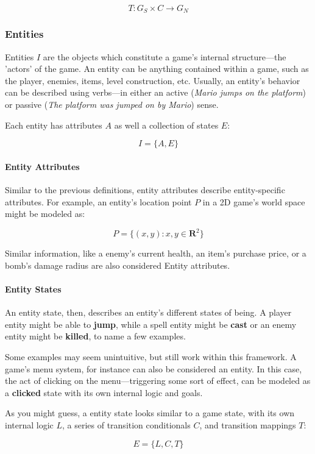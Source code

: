 \documentclass{report}
\begin{document}
$$
T: G_S \times C \longrightarrow G_N
$$

\subsubsection{Entities}
Entities $I$ are the objects which constitute a game's internal structure---the 'actors' of the game. An entity can be anything contained within a game, such as the player, enemies, items, level construction, etc.  Usually, an entity's behavior can be described using verbs---in either an active (\emph{Mario jumps on the platform}) or passive (\emph{The platform was jumped on by Mario}) sense.

Each entity has attributes $A$ as well a collection of states $E$:

$$I = \{A, E\}$$

\paragraph{Entity Attributes}
Similar to the previous definitions, entity attributes describe entity-specific attributes. For example, an entity's location point $P$ in a 2D game's world space might be modeled as:

$$P = \{(x,y): x,y \in \mathbf{R} ^2\}$$ 

Similar information, like a enemy's current health, an item's purchase price, or a bomb's damage radius are also considered Entity attributes. 

\paragraph{Entity States}
An entity state, then, describes an entity's different states of being. A player entity might be able to \textbf{jump}, while a spell entity might be \textbf{cast} or an enemy entity might be \textbf{killed}, to name a few examples. 

Some examples may seem unintuitive, but still work within this framework. A game's menu system, for instance can also be considered an entity. In this case, the act of clicking on the menu---triggering some sort of effect, can be modeled as a \textbf{clicked} state with its own internal logic and goals. 

As you might guess, a entity state looks similar to a game state, with its own internal logic $L$, a series of transition conditionals $C$, and transition mappings $T$:

$$E = \{L, C, T\}$$
\end{document}
